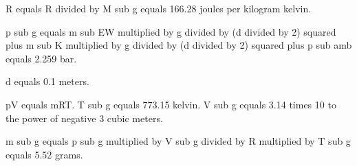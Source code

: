 R equals R divided by M sub g equals 166.28 joules per kilogram kelvin.  

p sub g equals m sub EW multiplied by g divided by (d divided by 2) squared plus m sub K multiplied by g divided by (d divided by 2) squared plus p sub amb equals 2.259 bar.  

d equals 0.1 meters.  

pV equals mRT.  
T sub g equals 773.15 kelvin.  
V sub g equals 3.14 times 10 to the power of negative 3 cubic meters.  

m sub g equals p sub g multiplied by V sub g divided by R multiplied by T sub g equals 5.52 grams.